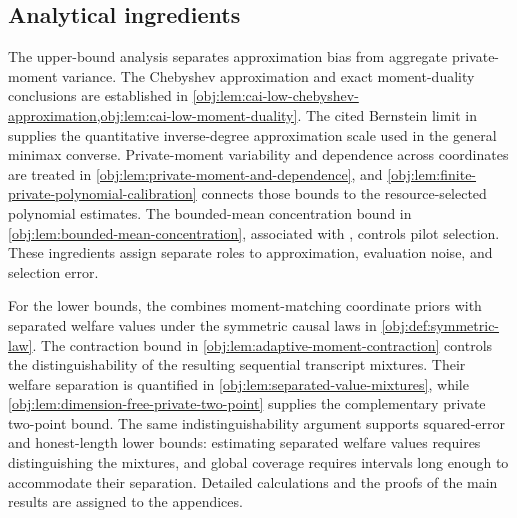 \subsection{Analytical ingredients}

The upper-bound analysis separates approximation bias from aggregate private-moment variance. The Chebyshev approximation and exact moment-duality conclusions are established in \cref{obj:lem:cai-low-chebyshev-approximation,obj:lem:cai-low-moment-duality}. The cited Bernstein limit in \citet[Section 3.1, p.~8]{CaiLow2011Nonsmooth} supplies the quantitative inverse-degree approximation scale used in the general minimax converse. Private-moment variability and dependence across coordinates are treated in \cref{obj:lem:private-moment-and-dependence}, and \cref{obj:lem:finite-private-polynomial-calibration} connects those bounds to the resource-selected polynomial estimates. The bounded-mean concentration bound in \cref{obj:lem:bounded-mean-concentration}, associated with \citet{Hoeffding1963Bounded}, controls pilot selection. These ingredients assign separate roles to approximation, evaluation noise, and selection error.

For the lower bounds, the  combines moment-matching coordinate priors with separated welfare values under the symmetric causal laws in \cref{obj:def:symmetric-law}. The contraction bound in \cref{obj:lem:adaptive-moment-contraction} controls the distinguishability of the resulting sequential transcript mixtures. Their welfare separation is quantified in \cref{obj:lem:separated-value-mixtures}, while \cref{obj:lem:dimension-free-private-two-point} supplies the complementary private two-point bound. The same indistinguishability argument supports squared-error and honest-length lower bounds: estimating separated welfare values requires distinguishing the mixtures, and global coverage requires intervals long enough to accommodate their separation. Detailed calculations and the proofs of the main results are assigned to the appendices.
